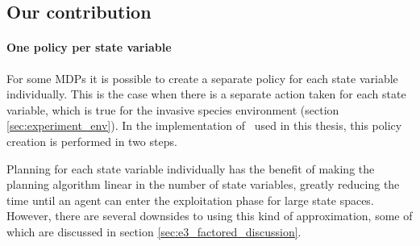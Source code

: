 \subsection{Our contribution}
\paragraph{One policy per state variable}
\label{sec:one_policy_per_state_variable}

For some MDPs it is possible to create a separate policy for each state
variable individually. This is the case when there is a separate action taken
for each state variable, which is true for the invasive species environment
(section \ref{sec:experiment_env}). In the implementation of \etre\ used in
this thesis, this policy creation is performed in two steps. 

Planning for each state variable individually has the benefit of making the planning algorithm linear in the number of state variables, greatly reducing the time until an agent can enter the exploitation phase for large state spaces. However, there are several downsides to using this kind of approximation, some of which are discussed in section \ref{sec:e3_factored_discussion}.
